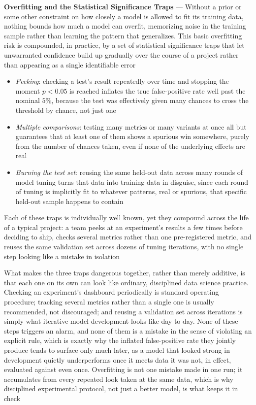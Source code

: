 \textbf{Overfitting and the Statistical Significance Traps} --- Without a prior
or some other constraint on how closely a model is allowed to fit its training
data, nothing bounds how much a model can overfit, memorizing noise in the
training sample rather than learning the pattern that generalizes. This basic overfitting
risk is compounded, in practice, by a set of statistical significance traps that
let unwarranted confidence build up gradually over the course of a project rather
than appearing as a single identifiable error

\begin{itemize}
  \item \emph{Peeking}: checking a test's result repeatedly over time and stopping
    the moment $p < 0.05$ is reached inflates the true false-positive rate well past
    the nominal $5\%$, because the test was effectively given many chances to
    cross the threshold by chance, not just one

  \item \emph{Multiple comparisons}: testing many metrics or many variants at once
    all but guarantees that at least one of them shows a spurious win somewhere,
    purely from the number of chances taken, even if none of the underlying effects
    are real

  \item \emph{Burning the test set}: reusing the same held-out data across many rounds
    of model tuning turns that data into training data in disguise, since each
    round of tuning is implicitly fit to whatever patterns, real or spurious,
    that specific held-out sample happens to contain
\end{itemize}

Each of these traps is individually well known, yet they compound across the
life of a typical project: a team peeks at an experiment's results a few times before
deciding to ship, checks several metrics rather than one pre-registered metric, and
reuses the same validation set across dozens of tuning iterations, with no
single step looking like a mistake in isolation

What makes the three traps dangerous together, rather than merely additive, is that
each one on its own can look like ordinary, disciplined data science practice. Checking
an experiment's dashboard periodically is standard operating procedure; tracking
several metrics rather than a single one is usually recommended, not discouraged;
and reusing a validation set across iterations is simply what iterative model
development looks like day to day. None of these steps triggers an alarm, and
none of them is a mistake in the sense of violating an explicit rule, which is exactly
why the inflated false-positive rate they jointly produce tends to surface only much
later, as a model that looked strong in development quietly underperforms once
it meets data it was not, in effect, evaluated against even once. Overfitting is
not one mistake made in one run; it accumulates from every repeated look taken
at the same data, which is why disciplined experimental protocol, not just a
better model, is what keeps it in check

